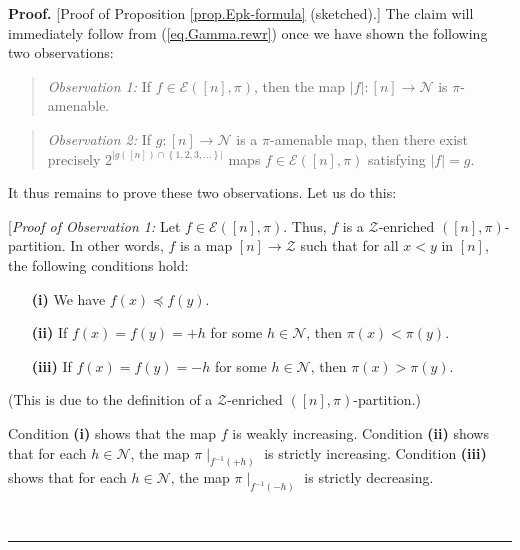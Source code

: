 \documentclass[numbers=enddot,12pt,final,onecolumn,notitlepage]{scrartcl}%
\theoremstyle{definition}
\newenvironment{statement}{\begin{quote}}{\end{quote}}
\newenvironment{proof}[1][Proof]{\noindent\textbf{#1.} }{\ \rule{0.5em}{0.5em}}
\newenvironment{vershort}{}{}
\begin{document}
\begin{vershort}
\begin{proof}
[Proof of Proposition \ref{prop.Epk-formula} (sketched).]
The claim will immediately follow from (\ref{eq.Gamma.rewr})
once we have shown the following two observations:

\begin{statement}
\textit{Observation 1:} If $f\in\mathcal{E}\left(  \left[  n\right]
,\pi\right)  $, then the map $\left\vert f\right\vert :\left[  n\right]
\rightarrow\mathcal{N}$ is $\pi$-amenable.
\end{statement}

\begin{statement}
\textit{Observation 2:} If $g:\left[  n\right]  \rightarrow\mathcal{N}$ is a
$\pi$-amenable map, then there exist precisely $2^{\left\vert g\left(  \left[
n\right]  \right)  \cap\left\{  1,2,3,\ldots\right\}  \right\vert }$ maps
$f\in\mathcal{E}\left(  \left[  n\right]  ,\pi\right)  $ satisfying
$\left\vert f\right\vert =g$.
\end{statement}

It thus remains to prove these two observations. Let us do this:

[\textit{Proof of Observation 1:} Let $f\in\mathcal{E}\left(  \left[
n\right]  ,\pi\right)  $. Thus, $f$ is a $\mathcal{Z}$-enriched $\left(
\left[  n\right]  ,\pi\right)  $-partition. In other words, $f$ is a map
$\left[  n\right]  \rightarrow\mathcal{Z}$ such that for all $x<y$ in $\left[
n\right]  $, the following conditions hold:

\begin{enumerate}
\item[\textbf{(i)}] We have $f\left(  x\right)  \preccurlyeq f\left(
y\right)  $.

\item[\textbf{(ii)}] If $f\left(  x\right)  =f\left(  y\right)  =+h$ for some
$h\in\mathcal{N}$, then $\pi\left(  x\right)  <\pi\left(  y\right)  $.

\item[\textbf{(iii)}] If $f\left(  x\right)  =f\left(  y\right)  =-h$ for some
$h\in\mathcal{N}$, then $\pi\left(  x\right)  >\pi\left(  y\right)  $.
\end{enumerate}

(This is due to the
definition of a $\mathcal{Z}$-enriched $\left(  \left[  n\right]  ,\pi\right)
$-partition.)

Condition \textbf{(i)} shows that the map $f$ is weakly increasing. Condition
\textbf{(ii)} shows that for each $h\in\mathcal{N}$, the map $\pi\mid
_{f^{-1}\left(  +h\right)  }$ is strictly increasing. Condition \textbf{(iii)}
shows that for each $h\in\mathcal{N}$, the map $\pi\mid_{f^{-1}\left(
-h\right)  }$ is strictly decreasing.


\end{proof}
\end{vershort}
\end{document}
